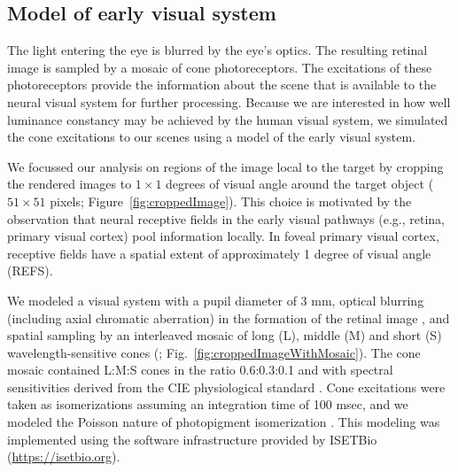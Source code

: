 \documentclass{jov}
\begin{document}
\subsection{Model of early visual system} \label{method:Isetbio}
The light entering the eye is blurred by the eye's optics.
The resulting retinal image is sampled by a mosaic of cone photoreceptors.
The excitations of these photoreceptors provide the information about the scene that is available to the neural visual system for further processing.
Because we are interested in how well luminance constancy may be achieved by the human visual system, we simulated the cone excitations
to our scenes using a model of the early visual system.

We focussed our analysis on regions of the image local to the target by cropping the rendered images to $1 \times 1$ degrees of visual angle around the target object ($51 \times 51$ pixels; Figure~\ref{fig:croppedImage}).
This choice is motivated by the observation that neural receptive fields in the early visual pathways (e.g., retina, primary visual cortex) pool information locally.
In foveal primary visual cortex, receptive fields have a spatial extent of approximately 1 degree of visual angle (REFS).

We modeled a visual system with a pupil diameter of 3 mm, optical blurring (including axial chromatic aberration) in the formation of the retinal image \cite{marimont1994matching}, and spatial sampling by an interleaved mosaic of long (L), middle (M)  and short (S) wavelength-sensitive cones (; Fig.~\ref{fig:croppedImageWithMosaic}). 
The cone mosaic contained L:M:S cones in the ratio 0.6:0.3:0.1 and with spectral sensitivities derived from the CIE physiological standard \cite{CIE86}.
Cone excitations were taken as isomerizations assuming an integration time of 100 msec, and we modeled the Poisson nature of photopigment isomerization \cite{hecht1942energy}. 
This modeling was implemented using the software infrastructure provided by ISETBio (\href{https://isetbio.org}{https://isetbio.org}).
\end{document}

